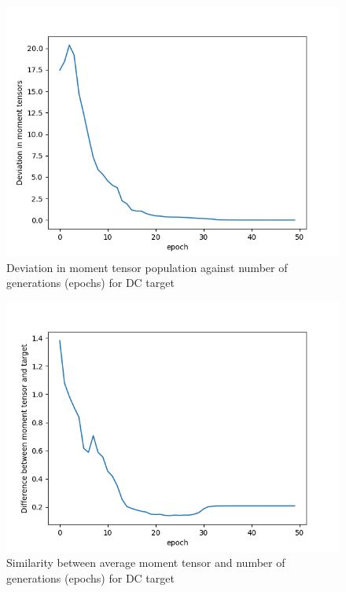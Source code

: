 \documentclass{article}
\begin{document}
\begin{figure}[H]
	\centering
	\includegraphics{dataSet1/MTDeviation.png}
	\caption{Deviation in moment tensor population against number of generations (epochs) for DC target}
	\label{MTDDC}
\end{figure}

\begin{figure}[H]
	\centering
	\includegraphics{dataSet1/MTsimilarity.png}
	\caption{Similarity between average moment tensor and number of generations (epochs) for DC target}
	\label{MTSDC}
\end{figure}
\end{document}
